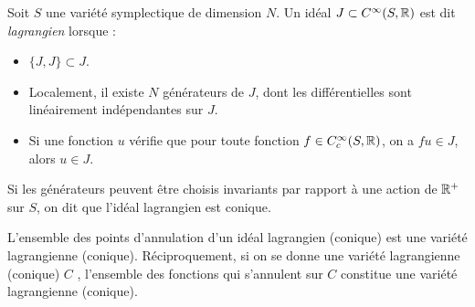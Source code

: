 \begin{defn}Soit $S$ une variété symplectique de dimension $N$. Un idéal $J \subset C^{\infty}(S,\mathbb{R})$ est dit \emph{lagrangien} lorsque :
\begin{itemize}
  \item $\{J,J\}\subset J$.
  \item Localement, il existe $N$ générateurs de $J$, dont les différentielles sont linéairement indépendantes sur $J$.
  \item Si une fonction $u$ vérifie que pour toute fonction $f \in C^{\infty}_c(S,\mathbb{R})$, on a $fu \in J$, alors $u \in J$.
\end{itemize}
Si les générateurs peuvent être choisis invariants par rapport à une action de $\mathbb{R}^+$ sur $S$, on dit que l'idéal lagrangien est conique.
\end{defn}
\begin{rem}
	L'ensemble des points d'annulation d'un idéal lagrangien (conique) est une variété lagrangienne (conique). Réciproquement, si on se donne une variété lagrangienne (conique) $C$ , l'ensemble des fonctions qui s'annulent sur $C$ constitue une variété lagrangienne (conique).
\end{rem}

